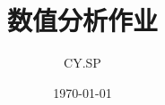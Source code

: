 \documentclass[11pt]{ctexart}
\title{数值分析作业}
\author{CY.SP}
\date{\today}
\numberwithin{equation}{subsection}
\begin{document}
	\maketitle
	\tableofcontents
	\everymath{\displaystyle}
	\clearpage
	
	
	
	
	
	
	
\end{document}
